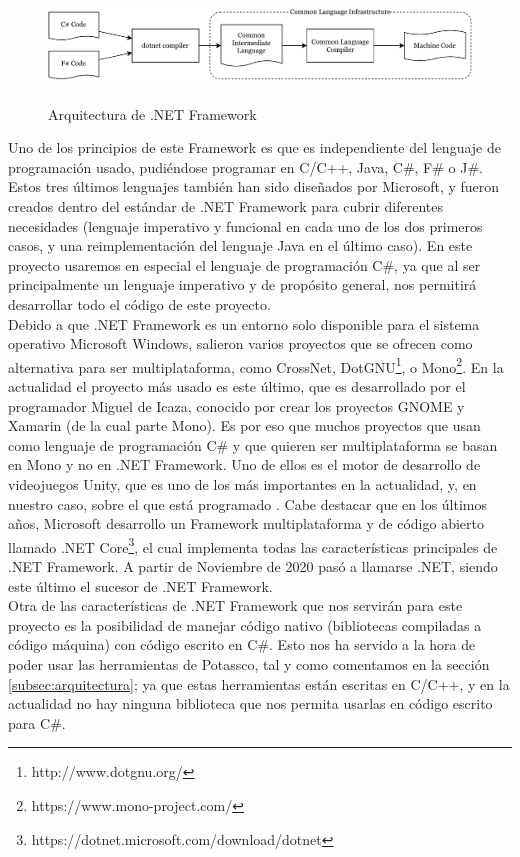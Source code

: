 \begin{figure}[h]
	\centering
	\includegraphics[height=6em]{images/arquitectura-cli}
	\label{fig:cli}
	\caption{Arquitectura de .NET Framework}
\end{figure}

Uno de los principios de este Framework es que es independiente del lenguaje de programación usado, pudiéndose programar en C/C++, Java, C\#, F\# o J\#. Estos tres últimos lenguajes también han sido diseñados por Microsoft, y fueron creados dentro del estándar de .NET Framework para cubrir diferentes necesidades (lenguaje imperativo y funcional en cada uno de los dos primeros casos, y una reimplementación del lenguaje Java en el último caso). En este proyecto usaremos en especial el lenguaje de programación C\#, ya que al ser principalmente un lenguaje imperativo y de propósito general, nos permitirá desarrollar todo el código de este proyecto. \\

Debido a que .NET Framework es un entorno solo disponible para el sistema operativo Microsoft Windows, salieron varios proyectos que se ofrecen como alternativa para ser multiplataforma, como CrossNet, DotGNU\footnote{http://www.dotgnu.org/}, o Mono\footnote{https://www.mono-project.com/}. En la actualidad el proyecto más usado es este último, que es desarrollado por el programador Miguel de Icaza, conocido por crear los proyectos GNOME y Xamarin (de la cual parte Mono). Es por eso que muchos proyectos que usan como lenguaje de programación C\# y que quieren ser multiplataforma se basan en Mono y no en .NET Framework. Uno de ellos es el motor de desarrollo de videojuegos Unity, que es uno de los más importantes en la actualidad, y, en nuestro caso, sobre el que está programado \cities. Cabe destacar que en los últimos años, Microsoft desarrollo un Framework multiplataforma y de código abierto llamado .NET Core\footnote{https://dotnet.microsoft.com/download/dotnet}, el cual implementa todas las características principales de .NET Framework. A partir de Noviembre de 2020 pasó a llamarse .NET, siendo este último el sucesor de .NET Framework. \\

Otra de las características de .NET Framework que nos servirán para este proyecto es la posibilidad de manejar código nativo (bibliotecas compiladas a código máquina) con código escrito en C\#. Esto nos ha servido a la hora de poder usar las herramientas de Potassco, tal y como comentamos en la sección \ref{subsec:arquitectura}; ya que estas herramientas están escritas en C/C++, y en la actualidad no hay ninguna biblioteca que nos permita usarlas en código escrito para C\#.

